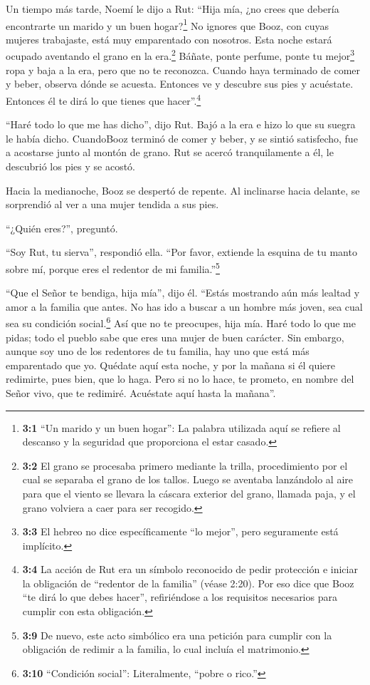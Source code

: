  Un tiempo más tarde, Noemí le dijo a Rut: ``Hija mía, ¿no
crees que debería encontrarte un marido y un buen hogar?\footnote{\textbf{3:1}
  ``Un marido y un buen hogar'': La palabra utilizada aquí se refiere al
  descanso y la seguridad que proporciona el estar casado.} 
No ignores que Booz, con cuyas mujeres trabajaste, está muy emparentado
con nosotros. Esta noche estará ocupado aventando el grano en la
era.\footnote{\textbf{3:2} El grano se procesaba primero mediante la
  trilla, procedimiento por el cual se separaba el grano de los tallos.
  Luego se aventaba lanzándolo al aire para que el viento se llevara la
  cáscara exterior del grano, llamada paja, y el grano volviera a caer
  para ser recogido.}  Báñate, ponte perfume, ponte tu
mejor\footnote{\textbf{3:3} El hebreo no dice específicamente ``lo
  mejor'', pero seguramente está implícito.} ropa y baja a la era, pero
que no te reconozca. Cuando haya terminado de comer y beber,
 observa dónde se acuesta. Entonces ve y descubre sus pies y
acuéstate. Entonces él te dirá lo que tienes que hacer''.\footnote{\textbf{3:4}
  La acción de Rut era un símbolo reconocido de pedir protección e
  iniciar la obligación de ``redentor de la familia'' (véase 2:20). Por
  eso dice que Booz ``te dirá lo que debes hacer'', refiriéndose a los
  requisitos necesarios para cumplir con esta obligación.}

 ``Haré todo lo que me has dicho'', dijo Rut. 
Bajó a la era e hizo lo que su suegra le había dicho. 
CuandoBooz terminó de comer y beber, y se sintió satisfecho, fue a
acostarse junto al montón de grano. Rut se acercó tranquilamente a él,
le descubrió los pies y se acostó.

 Hacia la medianoche, Booz se despertó de repente. Al
inclinarse hacia delante, se sorprendió al ver a una mujer tendida a sus
pies.

 ``¿Quién eres?'', preguntó.

``Soy Rut, tu sierva'', respondió ella. ``Por favor, extiende la esquina
de tu manto sobre mí, porque eres el redentor de mi
familia.''\footnote{\textbf{3:9} De nuevo, este acto simbólico era una
  petición para cumplir con la obligación de redimir a la familia, lo
  cual incluía el matrimonio.}

 ``Que el Señor te bendiga, hija mía'', dijo él. ``Estás
mostrando aún más lealtad y amor a la familia que antes. No has ido a
buscar a un hombre más joven, sea cual sea su condición
social.\footnote{\textbf{3:10} ``Condición social'': Literalmente,
  ``pobre o rico.''}  Así que no te preocupes, hija mía.
Haré todo lo que me pidas; todo el pueblo sabe que eres una mujer de
buen carácter.  Sin embargo, aunque soy uno de los
redentores de tu familia, hay uno que está más emparentado que yo.
 Quédate aquí esta noche, y por la mañana si él quiere
redimirte, pues bien, que lo haga. Pero si no lo hace, te prometo, en
nombre del Señor vivo, que te redimiré. Acuéstate aquí hasta la
mañana''.

